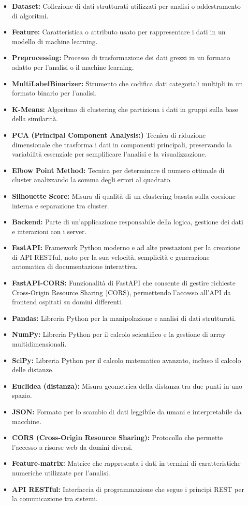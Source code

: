 \documentclass[a4paper,12pt]{article}
\begin{document}
\begin{itemize}
\item \textbf{Dataset:} Collezione di dati strutturati utilizzati per analisi o addestramento di algoritmi.
\item \textbf{Feature:} Caratteristica o attributo usato per rappresentare i dati in un modello di machine learning.
\item \textbf{Preprocessing:} Processo di trasformazione dei dati grezzi in un formato adatto per l'analisi o il machine learning.
\item \textbf{MultiLabelBinarizer:} Strumento che codifica dati categoriali multipli in un formato binario per l'analisi.
\item \textbf{K-Means:} Algoritmo di clustering che partiziona i dati in gruppi sulla base della similarità.
\item \textbf{PCA (Principal Component Analysis:)} Tecnica di riduzione dimensionale che trasforma i dati in componenti principali, preservando la variabilità essenziale per semplificare l'analisi e la visualizzazione.
\item \textbf{Elbow Point Method:} Tecnica per determinare il numero ottimale di cluster analizzando la somma degli errori al quadrato.
\item \textbf{Silhouette Score:} Misura di qualità di un clustering basata sulla coesione interna e separazione tra cluster.
\item \textbf{Backend:} Parte di un'applicazione responsabile della logica, gestione dei dati e interazioni con i server.
\item \textbf{FastAPI:} Framework Python moderno e ad alte prestazioni per la creazione di API RESTful, noto per la sua velocità, semplicità e generazione automatica di documentazione interattiva.
\item \textbf{FastAPI-CORS:} Funzionalità di FastAPI che consente di gestire richieste Cross-Origin Resource Sharing (CORS), permettendo l'accesso all'API da frontend ospitati su domini differenti.
\item \textbf{Pandas:} Libreria Python per la manipolazione e analisi di dati strutturati.
\item \textbf{NumPy:} Libreria Python per il calcolo scientifico e la gestione di array multidimensionali.
\item \textbf{SciPy:} Libreria Python per il calcolo matematico avanzato, incluso il calcolo delle distanze.
\item \textbf{Euclidea (distanza):} Misura geometrica della distanza tra due punti in uno spazio.
\item \textbf{JSON:} Formato per lo scambio di dati leggibile da umani e interpretabile da macchine.
\item \textbf{CORS (Cross-Origin Resource Sharing):} Protocollo che permette l'accesso a risorse web da domini diversi.
\item \textbf{Feature-matrix:} Matrice che rappresenta i dati in termini di caratteristiche numeriche utilizzate per l'analisi.
\item \textbf{API RESTful:} Interfaccia di programmazione che segue i principi REST per la comunicazione tra sistemi.
\end{itemize}
\end{document}
